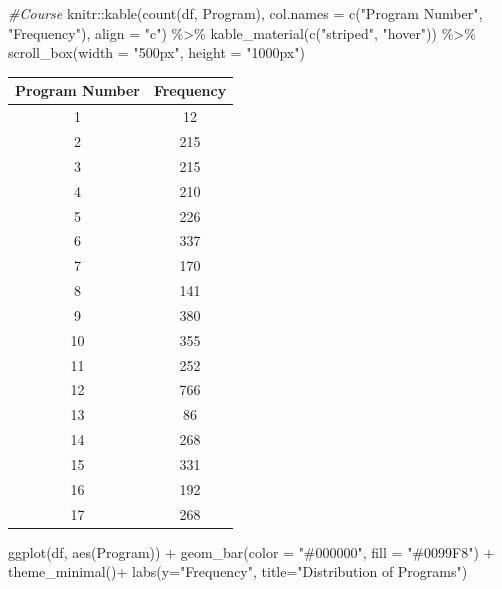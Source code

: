 \documentclass[
]{article}
\newenvironment{Shaded}{\begin{snugshade}}{\end{snugshade}}
\newcommand{\AttributeTok}[1]{\textcolor[rgb]{0.77,0.63,0.00}{#1}}
\newcommand{\CommentTok}[1]{\textcolor[rgb]{0.56,0.35,0.01}{\textit{#1}}}
\newcommand{\FunctionTok}[1]{\textcolor[rgb]{0.00,0.00,0.00}{#1}}
\newcommand{\NormalTok}[1]{#1}
\newcommand{\SpecialCharTok}[1]{\textcolor[rgb]{0.00,0.00,0.00}{#1}}
\newcommand{\StringTok}[1]{\textcolor[rgb]{0.31,0.60,0.02}{#1}}
\begin{document}
\begin{Shaded}
\begin{Highlighting}[]
\CommentTok{\#Course}
\NormalTok{knitr}\SpecialCharTok{::}\FunctionTok{kable}\NormalTok{(}\FunctionTok{count}\NormalTok{(df, }\StringTok{\textquotesingle{}Program\textquotesingle{}}\NormalTok{), }\AttributeTok{col.names =} \FunctionTok{c}\NormalTok{(}\StringTok{"Program Number"}\NormalTok{, }\StringTok{"Frequency"}\NormalTok{), }\AttributeTok{align =} \StringTok{"c"}\NormalTok{) }\SpecialCharTok{\%\textgreater{}\%}
  \FunctionTok{kable\_material}\NormalTok{(}\FunctionTok{c}\NormalTok{(}\StringTok{"striped"}\NormalTok{, }\StringTok{"hover"}\NormalTok{)) }\SpecialCharTok{\%\textgreater{}\%} 
 \FunctionTok{scroll\_box}\NormalTok{(}\AttributeTok{width =} \StringTok{"500px"}\NormalTok{, }\AttributeTok{height =} \StringTok{"1000px"}\NormalTok{)}
\end{Highlighting}
\end{Shaded}

\begin{table}
\centering
\begin{tabular}{c|c}
\hline
Program Number & Frequency\\
\hline
1 & 12\\
\hline
2 & 215\\
\hline
3 & 215\\
\hline
4 & 210\\
\hline
5 & 226\\
\hline
6 & 337\\
\hline
7 & 170\\
\hline
8 & 141\\
\hline
9 & 380\\
\hline
10 & 355\\
\hline
11 & 252\\
\hline
12 & 766\\
\hline
13 & 86\\
\hline
14 & 268\\
\hline
15 & 331\\
\hline
16 & 192\\
\hline
17 & 268\\
\hline
\end{tabular}
\end{table}

\begin{Shaded}
\begin{Highlighting}[]
\FunctionTok{ggplot}\NormalTok{(df, }\FunctionTok{aes}\NormalTok{(Program)) }\SpecialCharTok{+}
  \FunctionTok{geom\_bar}\NormalTok{(}\AttributeTok{color =} \StringTok{"\#000000"}\NormalTok{, }\AttributeTok{fill =} \StringTok{"\#0099F8"}\NormalTok{) }\SpecialCharTok{+} \FunctionTok{theme\_minimal}\NormalTok{()}\SpecialCharTok{+}
  \FunctionTok{labs}\NormalTok{(}\AttributeTok{y=}\StringTok{"Frequency"}\NormalTok{, }\AttributeTok{title=}\StringTok{"Distribution of Programs"}\NormalTok{)}
\end{Highlighting}
\end{Shaded}
\end{document}
